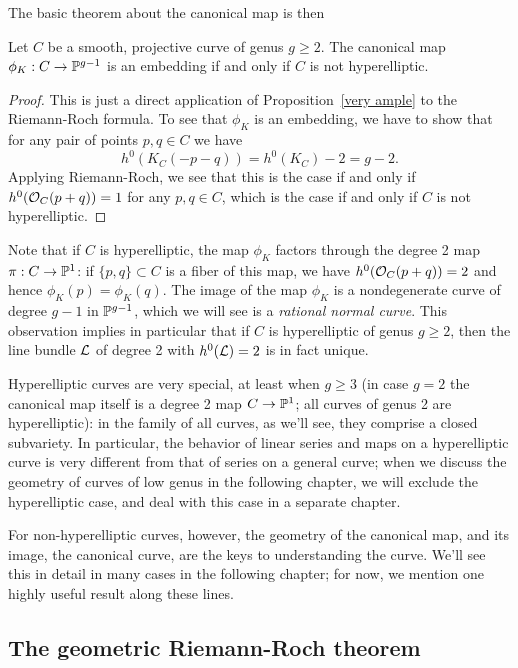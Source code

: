 The basic theorem about the canonical map is then

\begin{proposition}
Let $C$ be a smooth, projective curve of genus $g\geq 2$. The canonical map $\phi_K : C \to \PP^{g-1}$ is an embedding if and only if $C$ is not hyperelliptic.
\end{proposition}

\begin{proof}
This is just a direct application of Proposition~\ref{very ample} to the Riemann-Roch formula. To see that $\phi_K$ is an embedding, we have to show that for any pair of points $p, q \in C$ we have
$$
h^0(K_C(-p-q)) = h^0(K_C)-2 = g-2.
$$
Applying Riemann-Roch, we see that this is the case if and only if $h^0(\cO_C(p+q)) = 1$ for any $p,q \in C$, which is the case if and only if $C$ is not hyperelliptic.
\end{proof}

Note that if $C$ is hyperelliptic, the map $\phi_K$ factors through the degree 2 map $\pi : C \to \PP^1$: if $\{p,q\} \subset C$ is a fiber of this map, we have $h^0(\cO_C(p+q)) = 2$ and hence $\phi_K(p) = \phi_K(q)$. The image of the map $\phi_K$ is a nondegenerate curve of degree $g-1$ in $\PP^{g-1}$, which we will see is a \emph{rational normal curve}. This observation implies in particular that if $C$ is hyperelliptic of genus $g \geq 2$, then the line bundle $\cL$ of degree 2 with $h^0(\cL) = 2$ is in fact unique.

Hyperelliptic curves are very special, at least when $g \geq 3$ (in case $g=2$ the canonical map itself is a degree 2 map $C \to \PP^1$; all curves of genus 2 are hyperelliptic): in the family of all curves, as we'll see, they comprise a closed subvariety. In particular, the behavior of linear series and maps on a hyperelliptic curve is very different from that of series on a general curve; when we discuss the geometry of curves of low genus in the following chapter, we will exclude  the hyperelliptic case, and deal with this case in a separate chapter.

For non-hyperelliptic curves, however, the geometry of the canonical map, and its image, the canonical curve, are the keys to understanding the curve. We'll see this in detail in many cases in the following chapter; for now, we mention one highly useful result along these lines.

\subsection{The geometric Riemann-Roch theorem}

